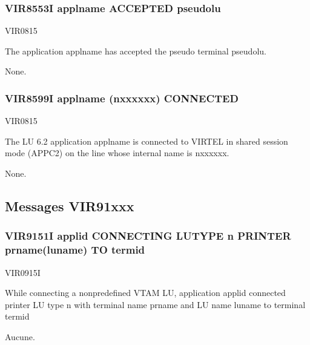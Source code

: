 \documentclass[letterpaper,10pt,english]{sphinxmanual}
\begin{document}
\subsubsection{VIR8553I applname ACCEPTED pseudolu}
\label{\detokenize{messages:vir8553i-applname-accepted-pseudolu}}\begin{description}
\sphinxAtStartPar
VIR0815

\sphinxAtStartPar
The application applname has accepted the pseudo terminal pseudolu.

\sphinxAtStartPar
None.

\end{description}


\subsubsection{VIR8599I applname (n\sphinxhyphen{}xxxxxx) CONNECTED}
\label{\detokenize{messages:vir8599i-applname-n-xxxxxx-connected}}\begin{description}
\sphinxAtStartPar
VIR0815

\sphinxAtStartPar
The LU 6.2 application applname is connected to VIRTEL in shared session mode (APPC2) on the line whose internal name is n\sphinxhyphen{}xxxxxx.

\sphinxAtStartPar
None.

\end{description}


\subsection{Messages VIR91xxx}
\label{\detokenize{messages:messages-vir91xxx}}

\subsubsection{VIR9151I applid CONNECTING LUTYPE n PRINTER prname(luname) TO termid}
\label{\detokenize{messages:vir9151i-applid-connecting-lutype-n-printer-prname-luname-to-termid}}\begin{description}
\sphinxAtStartPar
VIR0915I

\sphinxAtStartPar
While connecting a non\sphinxhyphen{}predefined VTAM LU, application applid connected printer LU type n with terminal name prname and LU name luname to terminal termid

\sphinxAtStartPar
Aucune.

\end{description}
\end{document}
